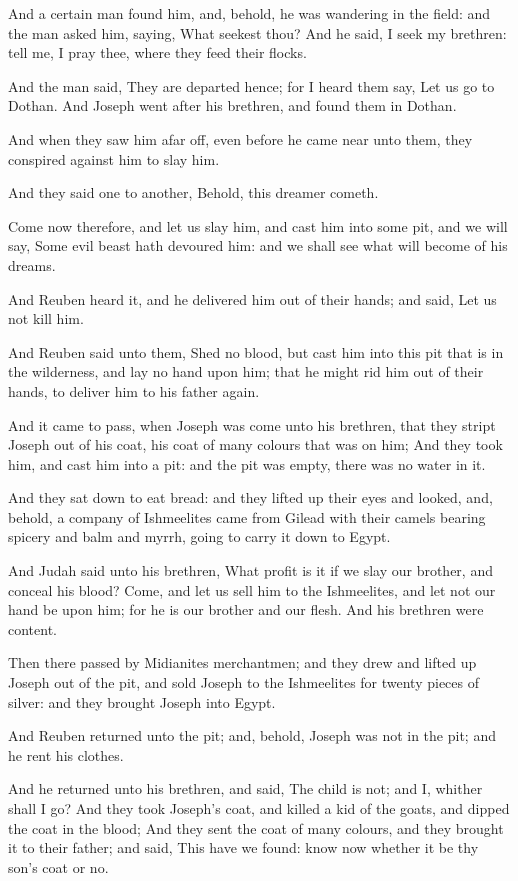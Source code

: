 \Verse And a certain man found him, and, behold, he was wandering in the field: and the man asked him, saying, What seekest thou?  \Verse And he said, I seek my brethren: tell me, I pray thee, where they feed their flocks.

\Verse And the man said, They are departed hence; for I heard them say, Let us go to Dothan. And Joseph went after his brethren, and found them in Dothan.

\Verse And when they saw him afar off, even before he came near unto them, they conspired against him to slay him.

\Verse And they said one to another, Behold, this dreamer cometh.

\Verse Come now therefore, and let us slay him, and cast him into some pit, and we will say, Some evil beast hath devoured him: and we shall see what will become of his dreams.

\Verse And Reuben heard it, and he delivered him out of their hands; and said, Let us not kill him.

\Verse And Reuben said unto them, Shed no blood, but cast him into this pit that is in the wilderness, and lay no hand upon him; that he might rid him out of their hands, to deliver him to his father again.

\Verse And it came to pass, when Joseph was come unto his brethren, that they stript Joseph out of his coat, his coat of many colours that was on him; \Verse And they took him, and cast him into a pit: and the pit was empty, there was no water in it.

\Verse And they sat down to eat bread: and they lifted up their eyes and looked, and, behold, a company of Ishmeelites came from Gilead with their camels bearing spicery and balm and myrrh, going to carry it down to Egypt.

\Verse And Judah said unto his brethren, What profit is it if we slay our brother, and conceal his blood?  \Verse Come, and let us sell him to the Ishmeelites, and let not our hand be upon him; for he is our brother and our flesh. And his brethren were content.

\Verse Then there passed by Midianites merchantmen; and they drew and lifted up Joseph out of the pit, and sold Joseph to the Ishmeelites for twenty pieces of silver: and they brought Joseph into Egypt.

\Verse And Reuben returned unto the pit; and, behold, Joseph was not in the pit; and he rent his clothes.

\Verse And he returned unto his brethren, and said, The child is not; and I, whither shall I go?  \Verse And they took Joseph's coat, and killed a kid of the goats, and dipped the coat in the blood; \Verse And they sent the coat of many colours, and they brought it to their father; and said, This have we found: know now whether it be thy son's coat or no.


